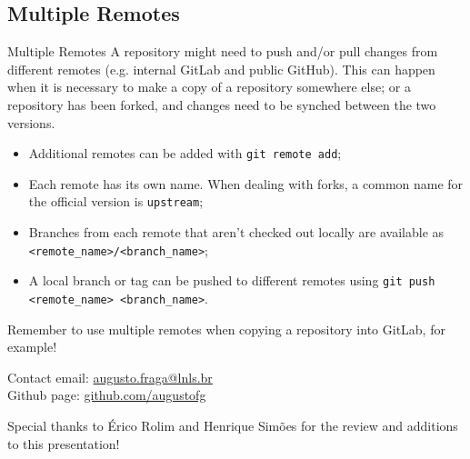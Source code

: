\documentclass{beamer}
\begin{document}
\subsection{Multiple Remotes}
\begin{frame}{Multiple Remotes}
  A repository might need to push and/or pull changes from different remotes (e.g. internal GitLab and public GitHub). This can happen when it is necessary to make a copy of a repository somewhere else; or a repository has been forked, and changes need to be synched between the two versions.
  \begin{itemize}
    \item Additional remotes can be added with \texttt{git remote add};
    \item Each remote has its own name. When dealing with forks, a common name for the official version is \texttt{upstream};
    \item Branches from each remote that aren't checked out locally are available as \texttt{<remote\_name>/<branch\_name>};
    \item A local branch or tag can be pushed to different remotes using \texttt{git push <remote\_name> <branch\_name>}.
  \end{itemize}
  \begin{block}{}
    Remember to use multiple remotes when copying a repository into GitLab, for example!
  \end{block}
\end{frame}

\begin{frame}{Contact}
  email: \href{mailto:augusto.fraga@lnls.br}{augusto.fraga@lnls.br} \\
  Github page: \url{github.com/augustofg} \\
  \begin{center}
    Special thanks to Érico Rolim and Henrique Simões for the review and additions to this presentation!
  \end{center}
\end{frame}
\end{document}
